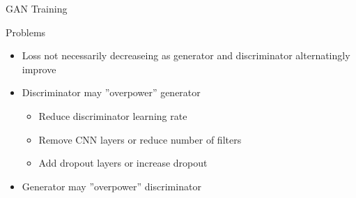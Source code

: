 \documentclass[ignorenonframetext,xcolor=x11names]{beamer}
\begin{document}

\begin{frame}{GAN Training}

\begin{block}{Problems}

\begin{itemize}
   \item Loss not necessarily decreaseing as generator and discriminator alternatingly improve
   \item Discriminator may ''overpower'' generator
   \begin{itemize}
       \item Reduce discriminator learning rate
       \item Remove CNN layers or reduce number of filters
       \item Add dropout layers or increase dropout
   \end{itemize}
   \item Generator may ''overpower'' discriminator
\end{itemize}
\end{block}
\end{frame}
\end{document}
